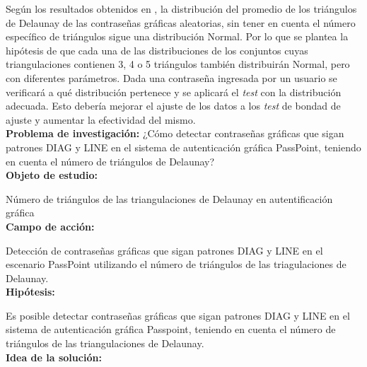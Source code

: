 \documentclass[12pt]{report}
\begin{document}
	
	Según los resultados obtenidos en \cite{13}, la distribución del promedio de los triángulos de  Delaunay de las contraseñas gráficas aleatorias, sin tener en cuenta el número específico de triángulos sigue una distribución Normal. Por lo que se plantea la hipótesis de que cada una de las distribuciones de los conjuntos cuyas triangulaciones contienen 3, 4 o 5 triángulos también distribuirán Normal, pero con diferentes parámetros. Dada una contraseña ingresada por un usuario se verificará a qué distribución pertenece y se aplicará el \textit{test} con la distribución adecuada. Esto debería mejorar el ajuste de los datos a los \textit{test} de bondad de ajuste y aumentar la efectividad del mismo.\\
	
\large{\textbf{Problema de investigación:}}	
\normalsize{¿Cómo  detectar contraseñas gráficas que sigan patrones DIAG y LINE  en el sistema de autenticación gráfica PassPoint, teniendo en cuenta el número de triángulos de Delaunay?}\\
	
	\large{\textbf{Objeto de estudio:}}
	
	\normalsize{Número de triángulos de las  triangulaciones de Delaunay  en autentificación gráfica}\\
	
		   
	\large{\textbf{Campo de acción:}}
	
	\normalsize{Detección de contraseñas gráficas que sigan patrones DIAG y LINE en el escenario PassPoint   utilizando  el número de triángulos de las triagulaciones de Delaunay}.\\
	 
	\large{\textbf{Hipótesis:}}

	\normalsize{Es posible detectar contraseñas gráficas que sigan patrones DIAG y LINE en el sistema de autenticación gráfica Passpoint, teniendo en cuenta el número de triángulos  de las triangulaciones de Delaunay}.\\
		
	
	\large{\textbf{Idea de la solución:}}
	
\end{document}
